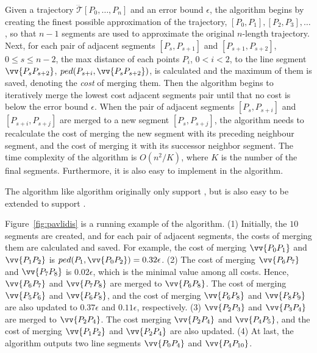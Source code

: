 Given a trajectory $\dddot{\mathcal{T}}[P_0, \ldots, P_n]$ and an error bound $\epsilon$,
the algorithm begins by creating the finest possible approximation of the trajectory, \ie $[P_0, P_1], [P_2, P_3], \ldots$, so that $n-1$ segments are used to approximate the original $n$-length trajectory.
Next, for each pair of adjacent segments $[P_{s}, P_{s+1}]$ and $[P_{s+1}, P_{s+2}]$, $0\le s \le n-2$,
the max distance of each points $P_i$, $0<i<2$, to the line segment $\vv{P_sP_{s+2}}$, \ie $ped(P_{s+i}, \vv{P_sP_{s+2}})$, is calculated and the maximum of them is saved, denoting the \emph{cost} of merging them.
Then the algorithm begins to iteratively merge the lowest cost adjacent segments pair
until that no cost is below the error bound $\epsilon$.
When the pair of adjacent segments $[P_{s}, P_{s+i}]$ and $[P_{s+i}, P_{s+j}]$ are merged to a new segment $[P_{s}, P_{s+j}]$, the algorithm needs to recalculate the cost of merging the new segment with its preceding neighbour segment, and the cost of merging it with its successor neighbor segment.
The time complexity of the algorithm is $O(n^2/K)$, where $K$ is the number of the final segments.
Furthermore, it is also easy to implement \sed in the \tpa algorithm.


The \tpa algorithm like \dpa algorithm originally only support \ped, but is also easy to be extended to support \sed.


\begin{example}
\label{exm-alg-squishe}
Figure~\ref{fig:pavlidis} is a running example of the \tpa algorithm.
(1) Initially, the $10$ segments are created, and for each pair of adjacent segments, the costs of merging them are calculated and saved. For example, the cost of merging $\vv{P_0P_1}$ and $\vv{P_1P_2}$ is $ped(P_{1}, \vv{P_0P_{2}}) = 0.32\epsilon$.
(2) The cost of merging $\vv{P_6P_7}$ and $\vv{P_7P_8}$ is $0.02\epsilon$, which is the minimal value among all costs. Hence, $\vv{P_6P_7}$ and $\vv{P_7P_8}$ are merged to $\vv{P_6P_8}$. The cost of merging $\vv{P_5P_6}$ and $\vv{P_6P_8}$, and the cost of merging $\vv{P_6P_8}$ and $\vv{P_8P_9}$ are also updated to $0.37\epsilon$ and $0.11\epsilon$, respectively.
(3) $\vv{P_2P_3}$ and $\vv{P_3P_4}$ are merged to $\vv{P_2P_4}$. The cost merging $\vv{P_2P_4}$ and $\vv{P_4P_5}$, and the cost of merging $\vv{P_1P_2}$ and $\vv{P_2P_4}$ are also updated.
(4) At last, the algorithm outputs two line segments $\vv{P_0P_4}$ and $\vv{P_4P_{10}}$.
\end{example}

